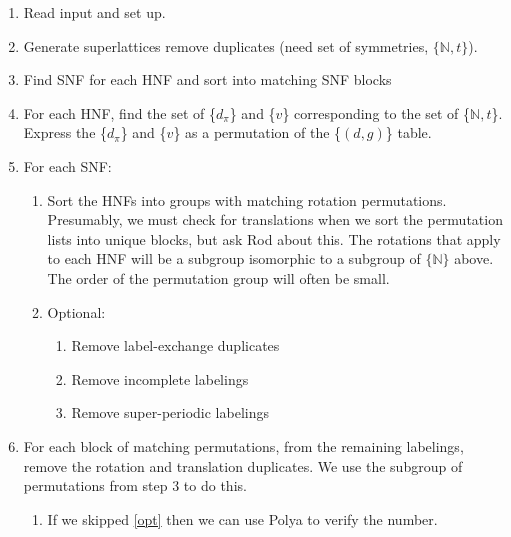 \documentclass{article}
\begin{document}
\begin{enumerate}
\item Read input and set up.
\item Generate superlattices remove duplicates (need set of symmetries, $\{\mathbb{N},t\}$). 
\item Find SNF for each HNF and sort into matching SNF blocks
\item For each HNF, find the set of \{$d_{\pi}$\} and \{$v$\} corresponding to the set of
  \{$\mathbb{N},t$\}. Express the \{$d_{\pi}$\} and \{$v$\} as a permutation of the \{$(d,g)$\}
  table.
\item For each SNF:
  \begin{enumerate}
  \item Sort the HNFs into groups with matching rotation permutations. Presumably, we must check for
    translations when we sort the permutation lists into unique blocks, but ask Rod about this. The
    rotations that apply to each HNF will be a subgroup isomorphic to a subgroup of $\{\mathbb{N}\}$
    above. The order of the permutation group will often be small.
  \item \label{opt}Optional:
    \begin{enumerate}
    \item Remove label-exchange duplicates
    \item Remove incomplete labelings
    \item Remove super-periodic labelings
    \end{enumerate}
  \end{enumerate}
\item For each block of matching permutations, from the remaining labelings, remove the rotation and
  translation duplicates. We use the subgroup of permutations from step 3 to do this.
\begin{enumerate}
\item If we skipped \ref{opt} then we can use Polya to verify the number.
\end{enumerate}

\end{enumerate}
\end{document}
